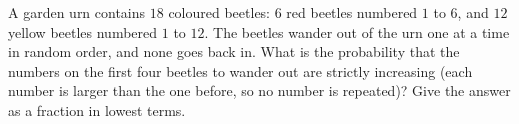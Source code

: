 A garden urn contains $18$ coloured beetles: $6$ red beetles numbered $1$ to $6$, and $12$ yellow beetles numbered $1$ to $12$. The beetles wander out of the urn one at a time in random order, and none goes back in. What is the probability that the numbers on the first four beetles to wander out are strictly increasing (each number is larger than the one before, so no number is repeated)? Give the answer as a fraction in lowest terms.
